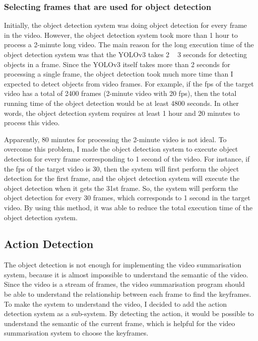 \documentclass{article}
\begin{document}
\subsubsection{Selecting frames that are used for object detection}

Initially, the object detection system was doing object detection for every frame in the video. However, the object detection system took more than 1 hour to process a 2-minute long video. The main reason for the long execution time of the object detection system was that the YOLOv3 takes 2 ~ 3 seconds for detecting objects in a frame. Since the YOLOv3 itself takes more than 2 seconds for processing a single frame, the object detection took much more time than I expected to detect objects from video frames. For example, if the fps of the target video has a total of 2400 frames (2-minute video with 20 fps), then the total running time of the object detection would be at least 4800 seconds. In other words, the object detection system requires at least 1 hour and 20 minutes to process this video.

Apparently, 80 minutes for processing the 2-minute video is not ideal. To overcome this problem, I made the object detection system to execute object detection for every frame corresponding to 1 second of the video. For instance, if the fps of the target video is 30, then the system will first perform the object detection for the first frame, and the object detection system will execute the object detection when it gets the 31st frame. So, the system will perform the object detection for every 30 frames, which corresponds to 1 second in the target video. By using this method, it was able to reduce the total execution time of the object detection system.

\subsection{Action Detection}

The object detection is not enough for implementing the video summarisation system, because it is almost impossible to understand the semantic of the video. Since the video is a stream of frames, the video summarisation program should be able to understand the relationship between each frame to find the keyframes. To make the system to understand the video, I decided to add the action detection system as a sub-system. By detecting the action, it would be possible to understand the semantic of the current frame, which is helpful for the video summarisation system to choose the keyframes.
\end{document}
